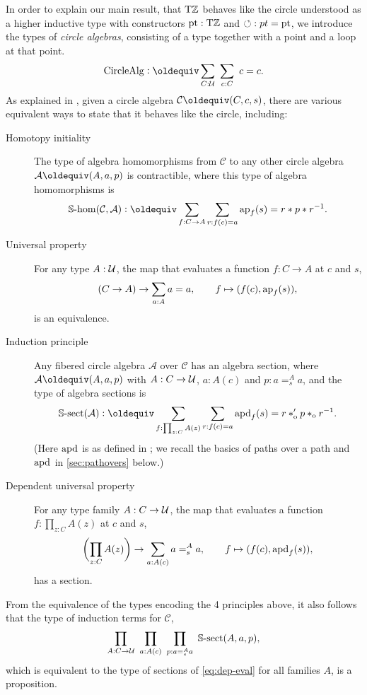 \documentclass[a4paper,12pt]{amsart}
\begin{document}
In order to explain our main result,
that ${\mathrm{T}\mathbb{Z}}$ behaves like the circle understood as a higher inductive type
with constructors ${\mathord{\mathrm{pt}}} : {\mathrm{T}\mathbb{Z}}$ and ${\circlearrowleft} : pt = {\mathord{\mathrm{pt}}}$,
we introduce the types of \emph{circle algebras},
consisting of a type together with a point and a loop at that point.
\[
  \CircleAlg \defeq \sum_{C:\UU}~\sum_{c:C}~ c = c.
\]
As explained in \cite{sojakova:hits-hias},
given a circle algebra $\mathcal C \jdeq (C,c,s)$,
there are various equivalent ways to state that it behaves like the circle,
including:
\begin{description}
\item[Homotopy initiality]
  The type of algebra homomorphisms
  from $\mathcal C$ to any other circle algebra $\mathcal A\jdeq(A,a,p)$
  is contractible, where this type of algebra homomorphisms is
  \begin{equation}\label{eq:circle-hom}
    \Shom(\mathcal C,\mathcal A) \defeq
    \sum_{f : C \to A}\sum_{r:f(c)=a} \ap{f}(s)=r \ct p \ct r^{-1}.
  \end{equation}
\item[Universal property]
  For any type $A:\mathcal{U}$, the map that evaluates a function $f : C \to A$
  at $c$ and $s$,
  \begin{equation}\label{eq:eval}
    (C \to A) \to \sum_{a : A} a=a,
    \qquad
    f \mapsto (f(c), \mathop{{\mathrm{ap}}_{f}}(s)),
  \end{equation}
  is an equivalence.
\item[Induction principle]
  Any fibered circle algebra $\mathcal A$ over $\mathcal C$ has an algebra section,
  where $\mathcal A\jdeq (A,a,p)$ with $A : C \to \mathcal{U}$, $a : A(c)$
  and $p : a=^A_s a$, and the type of algebra sections is
  \begin{equation}\label{eq:circle-sect}
    \Ssect(\mathcal A) \defeq
    \sum_{f: \prod_{z:C} A(z)}
    \sum_{r: f(c) = a}
    {\apd{f}(s) = r\cto' p \cto r^{-1}}.
  \end{equation}
  (Here $\mathop{{\mathrm{apd}}_{}}$ is as defined in \cite[2.3]{hottbook};
  we recall the basics of paths over a path and $\mathop{{\mathrm{apd}}_{}}$
  in \cref{sec:pathovers} below.)
\item[Dependent universal property]
  For any type family $A : C \to \mathcal{U}$, the map that evaluates a function
  $f : \prod_{z:C} A(z)$ at $c$ and $s$,
  \begin{equation}\label{eq:dep-eval}
    \biggl(\prod_{z:C} A(z)\biggr) \to \sum_{a:A(c)} a=^A_s a,
    \qquad
    f \mapsto (f(c), \mathop{{\mathrm{apd}}_{f}}(s)),
  \end{equation}
  has a section.
\end{description}
From the equivalence of the types encoding the 4 principles above, it also follows that the type of induction terms
for $\mathcal C$,
\begin{equation}
  \label{eq:circle-induction-gen}
  \prod_{A: C\to\mathcal{U}}~
  \prod_{a: A(c)}~
  \prod_{p: a=^A_s a}~
  \mathop{\mathbb{S}\textrm{-}\mathrm{sect}}(A,a,p),
\end{equation}
which is equivalent to the type of sections of \eqref{eq:dep-eval}
for all families $A$, is a proposition.
\end{document}
